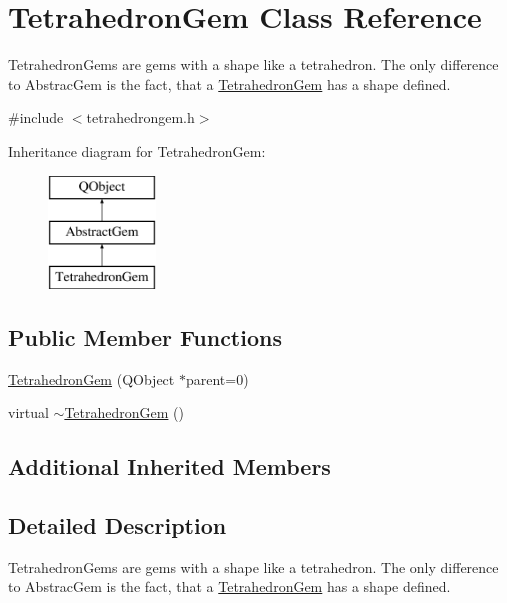 \hypertarget{class_tetrahedron_gem}{}\section{Tetrahedron\+Gem Class Reference}
\label{class_tetrahedron_gem}


Tetrahedron\+Gems are gems with a shape like a tetrahedron. The only difference to Abstrac\+Gem is the fact, that a \hyperlink{class_tetrahedron_gem}{Tetrahedron\+Gem} has a shape defined.  




{\ttfamily \#include $<$tetrahedrongem.\+h$>$}

Inheritance diagram for Tetrahedron\+Gem\+:\begin{figure}[H]
\begin{center}
\leavevmode
\includegraphics[height=3.000000cm]{class_tetrahedron_gem}
\end{center}
\end{figure}
\subsection*{Public Member Functions}
\begin{DoxyCompactItemize}
\item 
\hyperlink{class_tetrahedron_gem_af942fcb0a4da9b3dfcf989931b2bc393}{Tetrahedron\+Gem} (Q\+Object $\ast$parent=0)
\item 
virtual \hyperlink{class_tetrahedron_gem_ab44903e14715941beda3490914a229ae}{$\sim$\+Tetrahedron\+Gem} ()
\end{DoxyCompactItemize}
\subsection*{Additional Inherited Members}


\subsection{Detailed Description}
Tetrahedron\+Gems are gems with a shape like a tetrahedron. The only difference to Abstrac\+Gem is the fact, that a \hyperlink{class_tetrahedron_gem}{Tetrahedron\+Gem} has a shape defined. 

